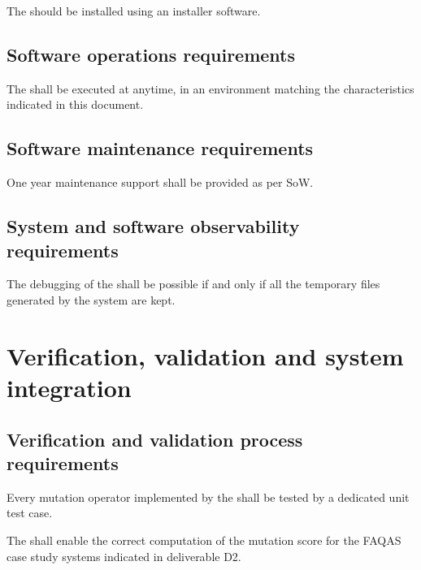 %
\RQ{} The \FAQAS should be installed using an installer software.


\section{Software operations requirements}

\RQ{} The \FAQAS shall be executed at anytime,
in an environment matching the characteristics indicated in this document.

\section{Software maintenance requirements}

\RQ{} One year maintenance support shall be provided as per SoW.

\section{System and software observability requirements}

\RQ{} The debugging of the \FAQAS shall be possible if and only if
all the temporary files generated by the system are kept.

\chapter{Verification, validation and system integration}
 \section{Verification and validation process requirements}

\RQ{} Every mutation operator implemented by the \FAQAS shall be tested by a dedicated unit test case.




 \RQ{} The \FAQAS shall enable the correct computation of the mutation score for the FAQAS case study systems indicated in deliverable D2.

